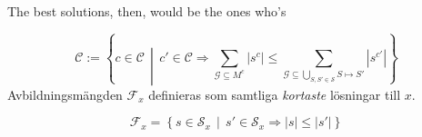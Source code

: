 
The best solutions, then, would be the ones who's

\begin{equation}
		\mathscr{C} := \left\{ c \in \mathcal{C} \,\middle|\, c'\in\mathcal{C} \Rightarrow \sum_{\mathcal{G}\subseteq M^c} \left|s^{c}\right| \le \sum_{\mathcal{G}\subseteq \underset {S,S'\in\mathcal{S}} \bigcup S\mapsto S'} \left|s^{c'}\right| \right\}
\end{equation}
Avbildningsmängden \(\mathscr{F}_x\) definieras som samtliga \textit{kortaste} lösningar till \(x\).

\begin{equation}
		\mathscr{F}_x=\left\{s\in\mathscr{S}_x \,\middle|\, s'\in \mathscr{S}_x \Rightarrow |s|\le|s'|\right\}
\end{equation}


